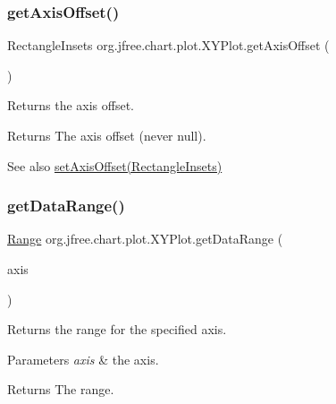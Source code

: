 \subsubsection{\texorpdfstring{get\+Axis\+Offset()}{getAxisOffset()}}
{\footnotesize\ttfamily Rectangle\+Insets org.\+jfree.\+chart.\+plot.\+X\+Y\+Plot.\+get\+Axis\+Offset (\begin{DoxyParamCaption}{ }\end{DoxyParamCaption})}

Returns the axis offset.

\begin{DoxyReturn}{Returns}
The axis offset (never {\ttfamily null}).
\end{DoxyReturn}
\begin{DoxySeeAlso}{See also}
\mbox{\hyperlink{classorg_1_1jfree_1_1chart_1_1plot_1_1_x_y_plot_a24db1e35222ca5d959dd0cb8246ed6b7}{set\+Axis\+Offset(\+Rectangle\+Insets)}} 
\end{DoxySeeAlso}
\mbox{\label{classorg_1_1jfree_1_1chart_1_1plot_1_1_x_y_plot_a69bd0446d06cc7002be74bba4ed12520}} 
\subsubsection{\texorpdfstring{get\+Data\+Range()}{getDataRange()}}
{\footnotesize\ttfamily \mbox{\hyperlink{classorg_1_1jfree_1_1data_1_1_range}{Range}} org.\+jfree.\+chart.\+plot.\+X\+Y\+Plot.\+get\+Data\+Range (\begin{DoxyParamCaption}\item[{\mbox{\hyperlink{classorg_1_1jfree_1_1chart_1_1axis_1_1_value_axis}{Value\+Axis}}}]{axis }\end{DoxyParamCaption})}

Returns the range for the specified axis.


\begin{DoxyParams}{Parameters}
{\em axis} & the axis.\\
\hline
\end{DoxyParams}
\begin{DoxyReturn}{Returns}
The range. 
\end{DoxyReturn}


